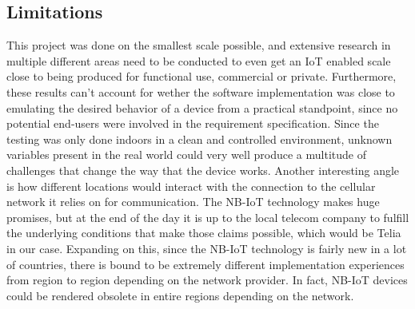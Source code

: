 \subsection{Limitations}
This project was done on the smallest scale possible, and extensive research in multiple different areas need to be conducted to even get an IoT enabled scale close to being produced for functional use, commercial or private.
Furthermore, these results can't account for wether the software implementation was close to emulating the desired behavior of a device from a practical standpoint, since no potential end-users were involved in the requirement specification.
Since the testing was only done indoors in a clean and controlled environment, unknown variables present in the real world could very well produce a multitude of challenges that change the way that the device works. Another interesting angle is how different locations would interact with the connection to the cellular network it relies on for communication. The NB-IoT technology makes huge promises, but at the end of the day it is up to the local telecom company to fulfill the underlying conditions that make those claims possible, which would be Telia in our case.
Expanding on this, since the NB-IoT technology is fairly new in a lot of countries, there is bound to be extremely different implementation experiences from region to region depending on the network provider. In fact, NB-IoT devices could be rendered obsolete in entire regions depending on the network.
